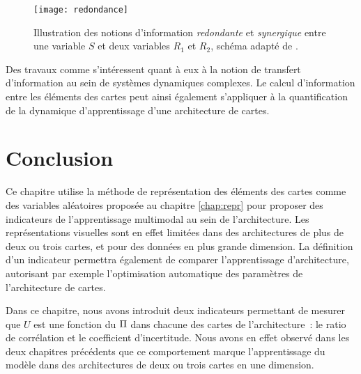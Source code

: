 \documentclass[../main]{subfiles}
\begin{document}
\begin{figure}
    \centering\texttt{[image: redondance]}
    \caption{Illustration des notions d'information \emph{redondante} et \emph{synergique} entre une variable $S$ et deux variables $R_1$ et $R_2$, schéma adapté de \cite{williams_nonnegative_2010}. \label{fig:redondance}
    }
\end{figure}

Des travaux comme \cite{lizier_detecting_2007,ceguerra_information_2011} s'intéressent quant à eux à la notion de transfert d'information au sein de systèmes dynamiques complexes. Le calcul d'information entre les éléments des cartes peut ainsi également s'appliquer à la quantification de la dynamique d'apprentissage d'une architecture de cartes.

\section{Conclusion}

Ce chapitre utilise la méthode de représentation des éléments des cartes comme des variables aléatoires proposée au chapitre \ref{chap:repr} pour proposer des indicateurs de l'apprentissage multimodal au sein de l'architecture.
Les représentations visuelles sont en effet limitées dans des architectures de plus de deux ou trois cartes, et pour des données en plus grande dimension. La définition d'un indicateur permettra également de comparer l'apprentissage d'architecture, autorisant par exemple l'optimisation automatique des paramètres de l'architecture de cartes.

Dans ce chapitre, nous avons introduit deux indicateurs permettant de mesurer que $U$ est une fonction du $\Pi$ dans chacune des cartes de l'architecture~: le ratio de corrélation et le coefficient d'incertitude.
Nous avons en effet observé dans les deux chapitres précédents que ce comportement marque l'apprentissage du modèle dans des architectures de deux ou trois cartes en une dimension.
\end{document}
